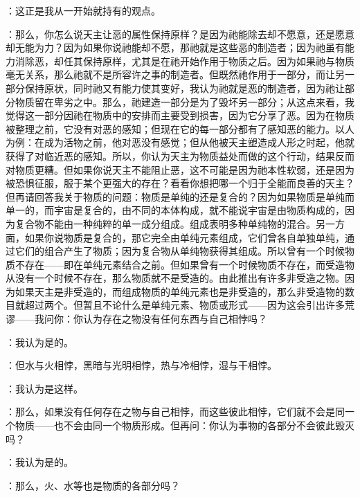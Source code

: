：这正是我从一开始就持有的观点。\par

：那么，你怎么说天主让恶的属性保持原样？是因为祂能除去却不愿意，还是愿意却无能为力？因为如果你说祂能却不愿，那祂就是这些恶的制造者；因为祂虽有能力消除恶，却任其保持原样，尤其是在祂开始作用于物质之后。因为如果祂与物质毫无关系，那么祂就不是所容许之事的制造者。但既然祂作用于一部分，而让另一部分保持原状，同时祂又有能力使其变好，我认为祂就是恶的制造者，因为祂让部分物质留在卑劣之中。那么，祂建造一部分是为了毁坏另一部分；从这点来看，我觉得这一部分因祂在物质中的安排而主要受到损害，因为它分享了恶。因为在物质被整理之前，它没有对恶的感知；但现在它的每一部分都有了感知恶的能力。以人为例：在成为活物之前，他对恶没有感觉；但从他被天主塑造成人形之时起，他就获得了对临近恶的感知。所以，你认为天主为物质益处而做的这个行动，结果反而对物质更糟。但如果你说天主不能阻止恶，这不可能是因为祂本性软弱，还是因为被恐惧征服，服于某个更强大的存在？看看你想把哪一个归于全能而良善的天主？但再请回答我关于物质的问题：物质是单纯的还是复合的？因为如果物质是单纯而单一的，而宇宙是复合的，由不同的本体构成，就不能说宇宙是由物质构成的，因为复合物不能由一种纯粹的单一成分组成。组成表明多种单纯物的混合。另一方面，如果你说物质是复合的，那它完全由单纯元素组成，它们曾各自单独单纯，通过它们的组合产生了物质；因为复合物从单纯物获得其组成。所以曾有一个时候物质不存在——即在单纯元素结合之前。但如果曾有一个时候物质不存在，而受造物从没有一个时候不存在，那么物质就不是受造的。由此推出有许多非受造之物。因为如果天主是非受造的，而组成物质的单纯元素也是非受造的，那么非受造物的数目就超过两个。但暂且不论什么是单纯元素、物质或形式——因为这会引出许多荒谬——我问你：你认为存在之物没有任何东西与自己相悖吗？\par

：我认为是的。\par

：但水与火相悖，黑暗与光明相悖，热与冷相悖，湿与干相悖。\par

：我认为是这样。\par

：那么，如果没有任何存在之物与自己相悖，而这些彼此相悖，它们就不会是同一个物质——也不会由同一个物质形成。但再问：你认为事物的各部分不会彼此毁灭吗？\par

：我认为是的。\par

：那么，火、水等也是物质的各部分吗？\par

